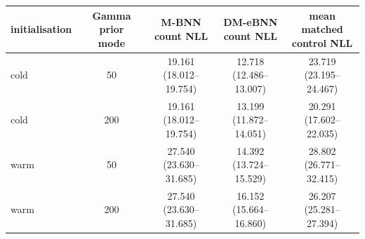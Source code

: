 \begin{tabular}{lcccc}
\toprule
initialisation & \shortstack{Gamma prior\\mode} & \shortstack{M-BNN\\count NLL} & \shortstack{DM-eBNN\\count NLL} & \shortstack{mean matched\\control NLL} \\
\midrule
cold & 50 & \shortstack{19.161\\(18.012--19.754)} & \shortstack{12.718\\(12.486--13.007)} & \shortstack{23.719\\(23.195--24.467)} \\
cold & 200 & \shortstack{19.161\\(18.012--19.754)} & \shortstack{13.199\\(11.872--14.051)} & \shortstack{20.291\\(17.602--22.035)} \\
warm & 50 & \shortstack{27.540\\(23.630--31.685)} & \shortstack{14.392\\(13.724--15.529)} & \shortstack{28.802\\(26.771--32.415)} \\
warm & 200 & \shortstack{27.540\\(23.630--31.685)} & \shortstack{16.152\\(15.664--16.860)} & \shortstack{26.207\\(25.281--27.394)} \\
\bottomrule
\end{tabular}
